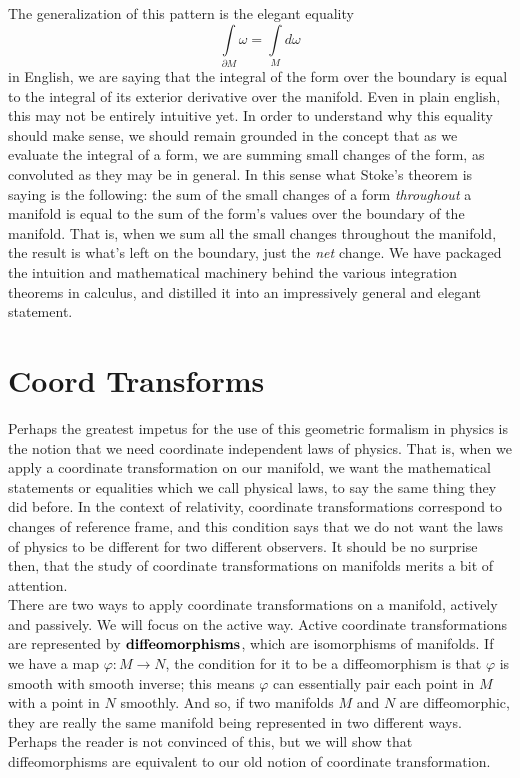 \text{}\\\\

The generalization of this pattern is the elegant equality 
\begin{equation*}
	\int\limits_{\partial M} \omega = \int\limits_M d\omega
\end{equation*}
in English, we are saying that the integral of the form over the boundary is equal to the integral of its exterior derivative over the manifold.  Even in plain english, this may not be entirely intuitive yet.  In order to understand why this equality should make sense, we should remain grounded in the concept that as we evaluate the integral of a form, we are summing small changes of the form, as convoluted as they may be in general.  In this sense what Stoke's theorem is saying is the following: the sum of the small changes of a form \textit{throughout} a manifold is equal to the sum of the form's values over the boundary of the manifold.  That is, when we sum all the small changes throughout the manifold, the result is what's left on the boundary, just the \textit{net} change.  We have packaged the intuition and mathematical machinery behind the various integration theorems in calculus, and distilled it into an impressively general and elegant statement.



\section*{Coord Transforms}
Perhaps the greatest impetus for the use of this geometric formalism in physics is the notion that we need coordinate independent laws of physics.  That is, when we apply a coordinate transformation on our manifold, we want the mathematical statements or equalities which we call physical laws, to say the same thing they did before.  In the context of relativity, coordinate transformations correspond to changes of reference frame, and this condition says that we do not want the laws of physics to be different for two different observers.  It should be no surprise then, that the study of coordinate transformations on manifolds merits a bit of attention.\\

There are two ways to apply coordinate transformations on a manifold, actively and passively.  We will focus on the active way.  Active coordinate transformations are represented by $\textbf{diffeomorphisms}\index{diffeomorphism}$, which are isomorphisms of manifolds.  If we have a map $\varphi: M \to N$, the condition for it to be a diffeomorphism is that $\varphi$ is smooth with smooth inverse;  this means $\varphi$ can essentially pair each point in $M$ with a point in $N$ smoothly.  And so, if two manifolds $M$ and $N$ are diffeomorphic, they are really the same manifold being represented in two different ways.  Perhaps the reader is not convinced of this, but we will show that diffeomorphisms are equivalent to our old notion of coordinate transformation.\\

